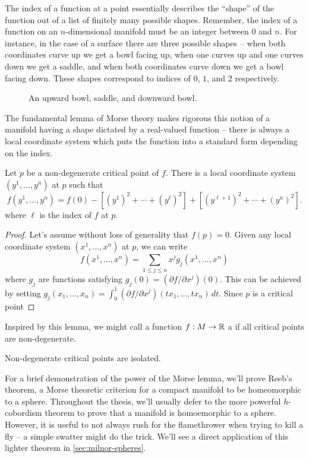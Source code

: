 The index of a function at a point essentially describes the ``shape'' of the function out of a list of finitely many possible shapes. Remember, the index of a function on an $n$-dimensional manifold must be an integer between $0$ and $n$. For instance, in the case of a surface there are three possible shapes -- when both coordinates curve up we get a bowl facing up, when one curves up and one curves down we get a saddle, and when both coordinates curve down we get a bowl facing down. These shapes correspond to indices of $0$, $1$, and $2$ respectively.
\begin{figure}[ht]
	\centering
	\medskip
	\caption{An upward bowl, saddle, and downward bowl.}
\end{figure}

The fundamental lemma of Morse theory makes rigorous this notion of a manifold having a shape dictated by a real-valued function -- there is always a local coordinate system which puts the function into a standard form depending on the index.

\begin{lemma}\label{lemma:morse}
	Let $p$ be a non-degenerate critical point of $f$. There is a local coordinate system $(y^1,\ldots, y^n)$ at $p$ such that
	\[
		f(y^1,\ldots, y^n)=f(0)-\left[(y^1)^2 + \cdots + (y^{\ell})^2\right] + \left[(y^{\ell + 1})^2 + \cdots + (y^n)^2\right].
	\]
	where $\ell$ is the index of $f$ at $p$.
\end{lemma}
\begin{proof}
	Let's assume without loss of generality that $f(p)=0$. Given any local coordinate system $(x^1,\ldots, x^n)$ at $p$, we can write
	\[
		f(x^1,\ldots, x^n) = \sum_{1\leq j \leq n} x^j g_j(x^1,\ldots, x^n)
	\]
	where $g_j$ are functions satisfying $g_j(0)=(\partial f / \partial x^j)(0)$. 
	This can be achieved by setting $g_j(x_1,\ldots, x_n) = \int_0^1 (\partial f/\partial x^j)(tx_1, \ldots, tx_n)\,dt$. Since $p$ is a critical point

\end{proof}

Inspired by this lemma, we might call a function $f : M \to \mathbb{R}$ a  if all critical points are non-degenerate.

\begin{corollary}
	Non-degenerate critical points are isolated.
\end{corollary}

For a brief demonstration of the power of the Morse lemma, we'll prove Reeb's theorem, a Morse theoretic criterion for a compact manifold to be homeomorphic to a sphere. Throughout the thesis, we'll usually defer to the more powerful $h$-cobordism theorem to prove that a manifold is homoemorphic to a sphere. 
However, it is useful to not always rush for the flamethrower when trying to kill a fly -- a simple swatter might do the trick. We'll see a direct application of this lighter theorem in \cref{sec:milnor-spheres}.


